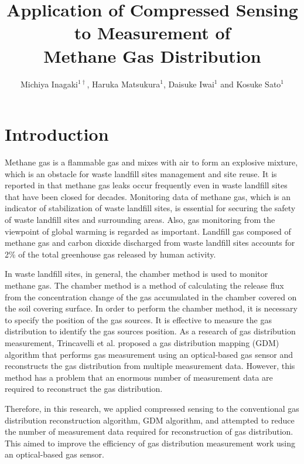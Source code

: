 \documentclass[fleqn,10pt,twocolumn]{SICE19}
\title{Application of Compressed Sensing to Measurement of\\
       Methane Gas Distribution}
\author{Michiya Inagaki${}^{1\dagger}$, Haruka Matsukura${}^{1}$, Daisuke Iwai${}^{1}$ and Kosuke Sato${}^{1}$}
\begin{document}
\maketitle


\section{Introduction}\label{sec:intro}

Methane gas is a flammable gas and mixes with air to form an explosive mixture, which is an obstacle for waste landfill sites management and site reuse. It is reported in \cite{ref1} that methane gas leaks occur frequently even in waste landfill sites that have been closed for decades. Monitoring data of methane gas, which is an indicator of stabilization of waste landfill sites, is essential for securing the safety of waste landfill sites and surrounding areas. Also, gas monitoring from the viewpoint of global warming is regarded as important. Landfill gas composed of methane gas and carbon dioxide discharged from waste landfill sites accounts for 2\% of the total greenhouse gas released by human activity\cite{ref23}.

In waste landfill sites, in general, the chamber method is used to monitor methane gas\cite{ref24}. The chamber method is a method of calculating the release flux from the concentration change of the gas accumulated in the chamber covered on the soil covering surface. In order to perform the chamber method, it is necessary to specify the position of the gas sources. It is effective to measure the gas distribution to identify the gas sources position. As a research of gas distribution measurement, Trincavelli et al. proposed a gas distribution mapping (GDM) algorithm that performs gas measurement using an optical-based gas sensor and reconstructs the gas distribution from multiple measurement data\cite{ref9}. However, this method has a problem that an enormous number of measurement data are required to reconstruct the gas distribution.

Therefore, in this research, we applied compressed sensing to the conventional gas distribution reconstruction algorithm, GDM algorithm, and attempted to reduce the number of measurement data required for reconstruction of gas distribution. This aimed to improve the efficiency of gas distribution measurement work using an optical-based gas sensor.
\end{document}
